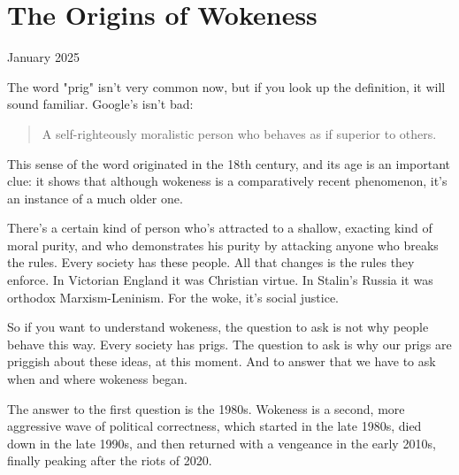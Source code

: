 \chapter{The Origins of Wokeness}


          
        
          


          
            
              
                

January 2025

The word "prig" isn't very common
                  now, but if you look up the definition, it will sound
                  familiar. Google's isn't bad:
                  \begin{quote}

                    A self-righteously moralistic person who behaves as if
                    superior to others.
                  
\end{quote}

                  This sense of the word originated in the 18th century, and its
                  age is an important clue: it shows that although wokeness is a
                  comparatively recent phenomenon, it's an instance of a much
                  older one.

There's a certain kind of person who's
                  attracted to a shallow, exacting kind of moral purity, and who
                  demonstrates his purity by attacking anyone who breaks the
                  rules. Every society has these people. All that changes is the
                  rules they enforce. In Victorian England it was Christian
                  virtue. In Stalin's Russia it was orthodox Marxism-Leninism.
                  For the woke, it's social justice.

So if you want
                  to understand wokeness, the question to ask is not why people
                  behave this way. Every society has prigs. The question to ask
                  is why our prigs are priggish about these ideas, at this
                  moment. And to answer that we have to ask when and where
                  wokeness began.

The answer to the first question is
                  the 1980s. Wokeness is a second, more aggressive wave of
                  political correctness, which started in the late 1980s, died
                  down in the late 1990s, and then returned with a vengeance in
                  the early 2010s, finally peaking after the riots of 2020.

